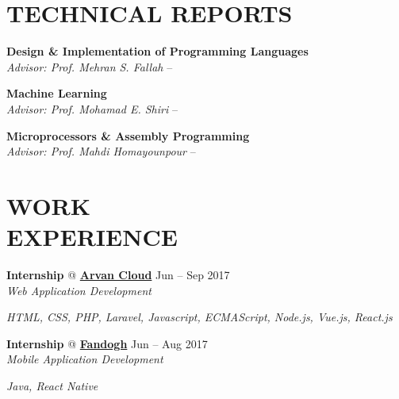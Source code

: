 \documentclass[margin, 10pt]{res} %
\begin{document}
\begin{resume}
\begin{innerlist}
	\end{innerlist}

  	\vspace{0.5cm}
     
    \section{TECHNICAL REPORTS}
    \textbf{Design \& Implementation of Programming Languages}\\
    \textit{Advisor: Prof. Mehran S. Fallah} -- 
    \href{https://github.com/aligholamee/HALFLIFE/tree/master/reports}{\UrlFont[docs]}
    
    \textbf{Machine Learning}\\
    \textit{Advisor: Prof. Mohamad E. Shiri} --
    \href{https://github.com/aligholamee/Hornburg}{\UrlFont[docs]}
    
    \textbf{Microprocessors \& Assembly Programming}\\
    \textit{Advisor: Prof. Mahdi Homayounpour} --
    \href{https://github.com/aligholamee/Microprocessors}{\UrlFont[docs]}

  	\vspace{0.5cm}
    
    \section{WORK \\ EXPERIENCE}
	\textbf{Internship} \textsc{@}
	\href{https://www.arvancloud.com/}{\textbf{Arvan Cloud}}
	\hfill {Jun -- Sep 2017}\\
	\textit{Web Application Development}
	\begin{innerlist}
		\item \textit{HTML, CSS, PHP, Laravel, Javascript, ECMAScript, Node.js, Vue.js, React.js}
	\end{innerlist}
	
	\textbf{Internship} \textsc{@}
	\href{http://www.fandogh.org/}{\textbf{Fandogh}}
	\hfill {Jun -- Aug 2017}\\
	\textit{Mobile Application Development}
	\begin{innerlist}
		\item \textit{Java, React Native}
	\end{innerlist}


\end{resume}
\end{document}
